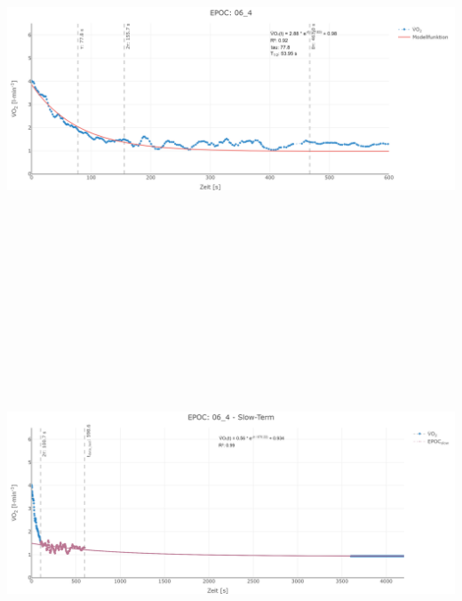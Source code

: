 \documentclass[
  letterpaper,
  DIV=11]{scrartcl}
\begin{document}
\includegraphics[width=11.45833in,height=4.6875in]{images/06_4_tau.png}
\includegraphics[width=11.45833in,height=4.6875in]{images/06_4_slow.png}
\end{document}
